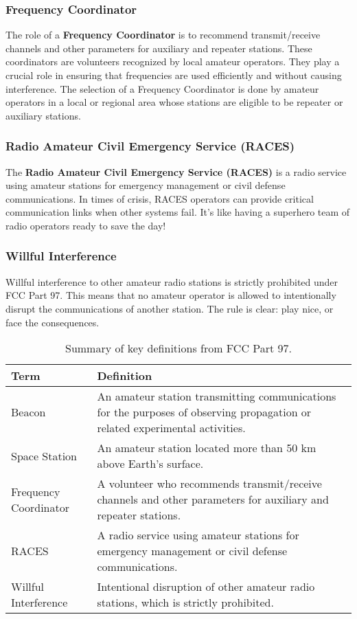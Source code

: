 \subsubsection*{Frequency Coordinator}
The role of a \textbf{Frequency Coordinator} is to recommend transmit/receive channels and other parameters for auxiliary and repeater stations. These coordinators are volunteers recognized by local amateur operators. They play a crucial role in ensuring that frequencies are used efficiently and without causing interference. The selection of a Frequency Coordinator is done by amateur operators in a local or regional area whose stations are eligible to be repeater or auxiliary stations.

\subsubsection*{Radio Amateur Civil Emergency Service (RACES)}
The \textbf{Radio Amateur Civil Emergency Service (RACES)} is a radio service using amateur stations for emergency management or civil defense communications. In times of crisis, RACES operators can provide critical communication links when other systems fail. It's like having a superhero team of radio operators ready to save the day!


\subsubsection*{Willful Interference}
Willful interference to other amateur radio stations is strictly prohibited under FCC Part 97. This means that no amateur operator is allowed to intentionally disrupt the communications of another station. The rule is clear: play nice, or face the consequences.

\begin{table}[h]
    \centering
    \caption{Summary of key definitions from FCC Part 97.}
    \label{tab:fcc-definitions-summary}
    \begin{tabular}{|l|p{8cm}|}
        \hline
        \textbf{Term} & \textbf{Definition} \\
        \hline
        Beacon & An amateur station transmitting communications for the purposes of observing propagation or related experimental activities. \\
        \hline
        Space Station & An amateur station located more than 50 km above Earth's surface. \\
        \hline
        Frequency Coordinator & A volunteer who recommends transmit/receive channels and other parameters for auxiliary and repeater stations. \\
        \hline
        RACES & A radio service using amateur stations for emergency management or civil defense communications. \\
        \hline
        Willful Interference & Intentional disruption of other amateur radio stations, which is strictly prohibited. \\
        \hline
    \end{tabular}
\end{table}


